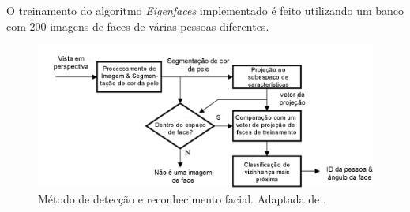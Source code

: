 O treinamento do algoritmo \textit{Eigenfaces} implementado é feito utilizando um banco com $\displaystyle 200$ imagens de faces de várias pessoas diferentes.

	\begin{figure}[hbt]
		\begin{center}
			\includegraphics[scale=0.8]{figuras/3.TrabalhosCorrelatos/facerec.png}
		\end{center}
		\caption{Método de detecção e reconhecimento facial. Adaptada
		de \cite{trivedi}.}
		\label{facerec}
	\end{figure}

